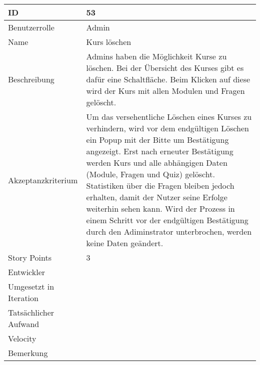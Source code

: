 \begin{tabularx}{\textwidth}{|p{}|X|}
	\hline
	ID & 53\\
	\hline
	Benutzerrolle & Admin\\
	\hline
	Name & Kurs löschen\\
	\hline
	Beschreibung & Admins haben die Möglichkeit Kurse zu löschen. Bei der Übersicht des Kurses
	gibt es dafür eine Schaltfläche. Beim Klicken auf diese wird der Kurs mit allen Modulen
	und Fragen gelöscht.\\
	\hline
	Akzeptanzkriterium & Um das versehentliche Löschen eines Kurses zu verhindern, wird vor dem
	endgültigen Löschen ein Popup mit der Bitte um Bestätigung angezeigt. Erst nach erneuter
	Bestätigung werden Kurs und alle abhängigen Daten (Module, Fragen und Quiz) gelöscht.
	Statistiken über die Fragen bleiben jedoch erhalten, damit der Nutzer seine Erfolge
	weiterhin sehen kann. Wird der Prozess in einem Schritt vor der endgültigen Bestätigung
	durch den Adiminstrator unterbrochen, werden keine Daten geändert.\\
	\hline
	Story Points & 3\\
	\hline
	Entwickler & \\
	\hline
	Umgesetzt in Iteration & \\ 
	\hline
	Tatsächlicher Aufwand & \\
	\hline
	Velocity & \\
	\hline
	Bemerkung & \\
	\hline
\end{tabularx}
\vspace{20pt}
